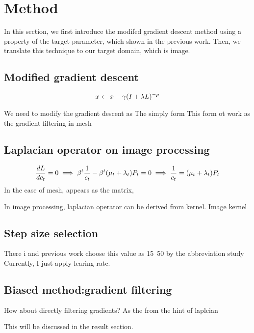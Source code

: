 \section*{Method}\label{ch:ch3label}

In this section, we first introduce the modifed gradient descent method using a property of the target parameter, which shown in the previous work\cite{Nicolet2021Large}. Then, we translate this technique to our target domain, which is image.

\subsection*{Modified gradient descent}
\begin{align}{\label{eq1}}
	x \leftarrow x - \gamma (I + \lambda L)^{-p} 
\end{align}

We need to modify the gradient descent as
The simply form
This form ot 
work as the gradient filtering in mesh

\subsection*{Laplacian operator on image processing}
\begin{align}{\label{eq2}}
	\frac{dL}{dc_t} = 0 \implies \beta^t\frac{1}{c_t}-\beta^t(\mu_t+\lambda_t)P_t=0 \implies \frac{1}{c_t}=(\mu_t+\lambda_t)P_t
\end{align}
In the case of mesh, appears as the matrix, 

In image processing, laplacian operator can be derived from kernel.
Image kernel

\subsection*{Step size selection}
There i and previous work choose this value as 15~50 by the abbreviation study
Currently, I just apply learing rate.

\subsection*{Biased method:gradient filtering}
How about directly filtering gradients? As the from the hint of laplcian

This will be discussed in the result section.
